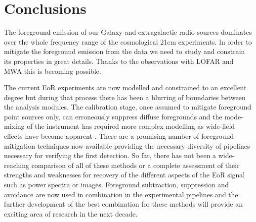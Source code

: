 \section{Conclusions}
The foreground emission of our Galaxy and extragalactic radio sources dominates over the whole frequency range of the cosmological 21cm experiments. In order to mitigate the foreground emission from the data we need to study and constrain its properties in great details. Thanks to the observations with LOFAR and MWA this is becoming possible.

The current EoR experiments are now modelled and constrained to an excellent degree but during that process there has been a blurring of boundaries between the analysis modules. The calibration stage, once assumed to mitigate foreground point sources only, can erroneously suppress diffuse foregrounds \cite{Patil2016MNRAS.463.4317P} and the mode-mixing of the instrument has required more complex modelling as wide-field effects have become apparent \cite{Thyagarajan2015ApJ...807L..28T}. There are a promising number of foreground mitigation techniques now available providing the necessary diversity of pipelines necessary for verifying the first detection. So far, there has not been a wide-reaching comparison of all of these methods or a complete assessment of their strengths and weaknesses for recovery of the different aspects of the EoR signal such as power spectra or images. Foreground subtraction, suppression and avoidance are now used in combination in the experimental pipelines and the further development of the best combination for these methods will provide an exciting area of research in the next decade.




